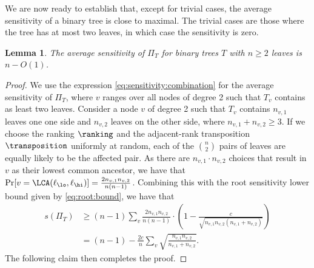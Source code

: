 \documentclass[11pt]{article}
\numberwithin{equation}{section}
\newtheorem{lemma}[theorem]{Lemma}
\theoremstyle{definition}
\theoremstyle{plain}
\begin{document}
We are now ready to establish that, except for trivial cases, the average sensitivity of a binary tree is close to maximal. The trivial cases are those where the tree has at most two leaves, in which case the sensitivity is zero. 
\begin{lemma}
\label{lemma:sensitivity:binary}
The average sensitivity of $\Pi_T$ for binary trees $T$ with $n \ge 2$ leaves is $n-O(1)$.
\end{lemma}
\begin{proof}
We use the expression \eqref{eq:sensitivity:combination} for the average sensitivity of $\Pi_T$, where $v$ ranges over all nodes of degree 2 such that $T_v$ contains as least two leaves.
Consider a node $v$ of degree 2 such that $T_v$ contains $n_{v,1}$ leaves one one side and $n_{v,2}$ leaves on the other side, where $n_{v,1}+n_{v,2} \ge 3$. If we choose the ranking $\ranking$ and the adjacent-rank transposition $\transposition$ uniformly at random, each of the $\binom{n}{2}$ pairs of leaves are equally likely to be the affected pair. As there are $n_{v,1} \cdot n_{v,2}$ choices that result in $v$ as their lowest common ancestor, we have that
$\Pr[ v = \LCA(\ell_\lo,\ell_\hi) ] = \frac{2 n_{v,1} n_{v,2}}{n(n-1)}$. Combining this with the root sensitivity lower bound given by \eqref{eq:root:bound}, we have that
\begin{align*} 
s(\Pi_T) & \ge (n-1) \sum_v \frac{2 n_{v,1} n_{v,2}}{n(n-1)} \cdot \left( 1 - \frac{c}{\sqrt{n_{v,1} n_{v,2} (n_{v,1}+n_{v,2})}} \right)  \\
& = (n-1) - \frac{2c}{n} \sum_v \sqrt{\frac{n_{v,1} n_{v,2}}{n_{v,1}+n_{v,2}}}. 
\end{align*}
The following claim then completes the proof.
\end{proof}
\end{document}
